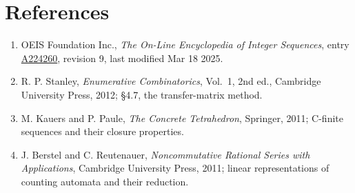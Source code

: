 \documentclass[11pt]{article}
\theoremstyle{definition}
\begin{document}
\section{References}

\begin{enumerate}

\item OEIS Foundation Inc., \emph{The On-Line Encyclopedia of Integer Sequences}, entry \href{https://oeis.org/A224260}{A224260}, revision 9, last modified Mar 18 2025.

\item R. P. Stanley, \emph{Enumerative Combinatorics}, Vol.~1, 2nd ed., Cambridge University Press, 2012; \S4.7, the transfer-matrix method.

\item M. Kauers and P. Paule, \emph{The Concrete Tetrahedron}, Springer, 2011; C-finite sequences and their closure properties.

\item J. Berstel and C. Reutenauer, \emph{Noncommutative Rational Series with Applications}, Cambridge University Press, 2011; linear representations of counting automata and their reduction.

\end{enumerate}
\end{document}
